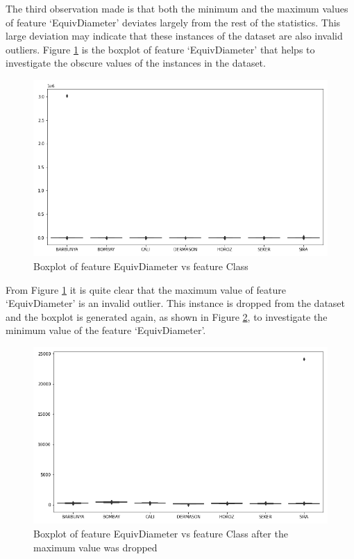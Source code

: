 \documentclass[10pt, conference]{IEEEtran}
\begin{document}
The third observation made is that both the minimum and the maximum values of feature `EquivDiameter' deviates
largely from the rest of the statistics. This large deviation may indicate that these instances of the dataset
are also invalid outliers. Figure \ref{EquivDiameter boxplot before} is the boxplot of feature `EquivDiameter'
that helps to investigate the obscure values of the instances in the dataset.
\begin{figure}[H]
    \centerline{\includegraphics[scale=0.35]{../Plots/EquivDiameter outlier boxplot.png}}
    \caption{Boxplot of feature EquivDiameter vs feature Class}
    \label{EquivDiameter boxplot before}
\end{figure}

From Figure \ref{EquivDiameter boxplot before} it is quite clear that the maximum value of feature `EquivDiameter'
is an invalid outlier. This instance is dropped from the dataset and the boxplot is generated again, as shown
in Figure \ref{EquivDiameter boxplot before 2}, to investigate the minimum value of the feature `EquivDiameter'.
\begin{figure}[h!]
    \centerline{\includegraphics[scale=0.35]{../Plots/EquivDiameter outlier boxplot 2.png}}
    \caption{Boxplot of feature EquivDiameter vs feature Class after the maximum value was dropped}
    \label{EquivDiameter boxplot before 2}
\end{figure}
\end{document}
